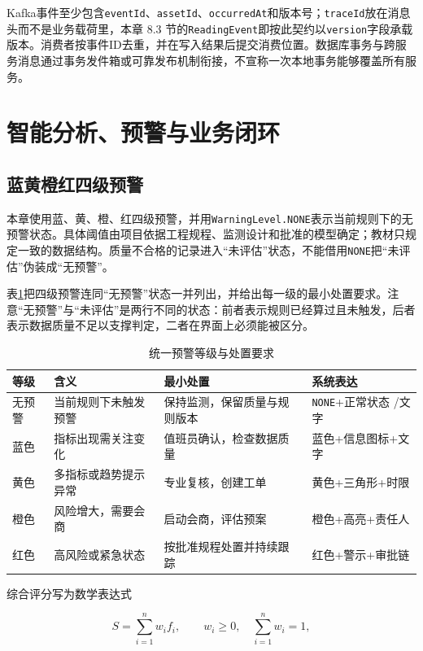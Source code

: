 Kafka事件至少包含\texttt{eventId}、\texttt{assetId}、\texttt{occurredAt}和版本号；\texttt{traceId}放在消息头而不是业务载荷里，本章 8.3 节的\texttt{ReadingEvent}即按此契约以\texttt{version}字段承载版本。消费者按事件ID去重，并在写入结果后提交消费位置。数据库事务与跨服务消息通过事务发件箱或可靠发布机制衔接，不宣称一次本地事务能够覆盖所有服务。

\section{智能分析、预警与业务闭环}

\subsection{蓝黄橙红四级预警}

本章使用蓝、黄、橙、红四级预警，并用\texttt{WarningLevel.NONE}表示当前规则下的无预警状态。具体阈值由项目依据工程规程、监测设计和批准的模型确定；教材只规定一致的数据结构。质量不合格的记录进入“未评估”状态，不能借用\texttt{NONE}把“未评估”伪装成“无预警”。

表\ref{tab:warning-levels}把四级预警连同“无预警”状态一并列出，并给出每一级的最小处置要求。注意“无预警”与“未评估”是两行不同的状态：前者表示规则已经算过且未触发，后者表示数据质量不足以支撑判定，二者在界面上必须能被区分。

\begin{table}[htbp]
\centering
\caption{统一预警等级与处置要求}
\label{tab:warning-levels}
\begin{tabular}{p{1.8cm}p{3.7cm}p{4.3cm}p{3.1cm}}
\toprule
等级 & 含义 & 最小处置 & 系统表达 \\
\midrule
无预警 & 当前规则下未触发预警 & 保持监测，保留质量与规则版本 & \texttt{NONE}+正常状态 \slash 文字 \\
蓝色 & 指标出现需关注变化 & 值班员确认，检查数据质量 & 蓝色+信息图标+文字 \\
黄色 & 多指标或趋势提示异常 & 专业复核，创建工单 & 黄色+三角形+时限 \\
橙色 & 风险增大，需要会商 & 启动会商，评估预案 & 橙色+高亮+责任人 \\
红色 & 高风险或紧急状态 & 按批准规程处置并持续跟踪 & 红色+警示+审批链 \\
\bottomrule
\end{tabular}
\end{table}

综合评分写为数学表达式

\[
S=\sum_{i=1}^{n} w_i f_i,\qquad
w_i\ge 0,\quad \sum_{i=1}^{n}w_i=1,
\]

